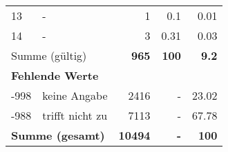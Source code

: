 \begin{longtable}{lXrrr}
     13 &
     \multicolumn{1}{X}{ -  } &


       \num{1} &
       \num[round-mode=places,round-precision=2]{0,1} &
         \num[round-mode=places,round-precision=2]{0,01} \\

     14 &
     \multicolumn{1}{X}{ -  } &


       \num{3} &
       \num[round-mode=places,round-precision=2]{0,31} &
         \num[round-mode=places,round-precision=2]{0,03} \\
     \midrule
     \multicolumn{2}{l}{Summe (gültig)} &
       \textbf{\num{965}} &
     \textbf{100} &
       \textbf{\num[round-mode=places,round-precision=2]{9,2}} \\
     \multicolumn{5}{l}{\textbf{Fehlende Werte}}\\
       -998 &
       keine Angabe &
         \num{2416} &
        - &
         \num[round-mode=places,round-precision=2]{23,02} \\
       -988 &
       trifft nicht zu &
         \num{7113} &
        - &
         \num[round-mode=places,round-precision=2]{67,78} \\
     \midrule
     \multicolumn{2}{l}{\textbf{Summe (gesamt)}} &
          \textbf{\num{10494}} &
        \textbf{-} &
        \textbf{100} \\
     \bottomrule
     \end{longtable}
     
